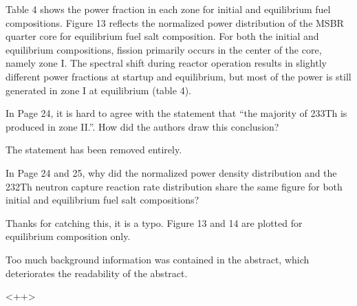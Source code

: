 \documentclass[answers,11pt]{exam}
\begin{document}
\begin{questions}
\begin{solution}
                 Table 4 shows the power fraction in each zone for initial and 
                 equilibrium fuel compositions. Figure 13 reflects the normalized 
                 power distribution of the MSBR quarter core for equilibrium 
                 fuel salt composition. For both the initial and equilibrium 
                 compositions, fission primarily occurs in the center of the core, 
                 namely zone I. The spectral shift during reactor operation results 
                 in slightly different power fractions at startup and equilibrium, 
                 but most of the power is still generated in zone I at equilibrium 
				 (table 4).                  
                   
        \end{solution}

        \question  In Page 24, it is hard to agree with the statement that ``the 
        majority of 233Th is produced in zone II.''. How did the authors draw 
        this conclusion?
        \begin{solution}
                The statement has been removed entirely.
        \end{solution}

        \question  In Page 24 and 25, why did the normalized power density 
        distribution and the 232Th neutron capture reaction rate distribution 
        share the same figure for both initial and equilibrium fuel salt 
        compositions?
        \begin{solution}
                Thanks for catching this, it is a typo. Figure 13 and 14 are plotted 
                for equilibrium composition only.            	    
        \end{solution}

        \question  Too much background information was contained in the 
        abstract, which deteriorates the readability of the abstract.
        \begin{solution}
                <++>
        \end{solution}

\end{questions}


\end{document}
